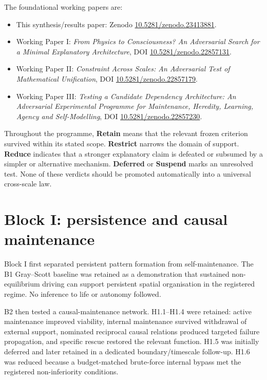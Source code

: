 \documentclass[11pt,a4paper]{article}
\begin{document}
The foundational working papers are:
\begin{itemize}[leftmargin=*]
\item This synthesis/results paper: Zenodo \href{https://doi.org/10.5281/zenodo.23413881}{10.5281/zenodo.23413881}.
\item Working Paper I: \emph{From Physics to Consciousness? An Adversarial Search for a Minimal Explanatory Architecture}, DOI \href{https://doi.org/10.5281/zenodo.22857131}{10.5281/zenodo.22857131}.
\item Working Paper II: \emph{Constraint Across Scales: An Adversarial Test of Mathematical Unification}, DOI \href{https://doi.org/10.5281/zenodo.22857179}{10.5281/zenodo.22857179}.
\item Working Paper III: \emph{Testing a Candidate Dependency Architecture: An Adversarial Experimental Programme for Maintenance, Heredity, Learning, Agency and Self-Modelling}, DOI \href{https://doi.org/10.5281/zenodo.22857230}{10.5281/zenodo.22857230}.
\end{itemize}

Throughout the programme, \textbf{Retain} means that the relevant frozen criterion survived within its stated scope. \textbf{Restrict} narrows the domain of support. \textbf{Reduce} indicates that a stronger explanatory claim is defeated or subsumed by a simpler or alternative mechanism. \textbf{Deferred} or \textbf{Suspend} marks an unresolved test. None of these verdicts should be promoted automatically into a universal cross-scale law.

\section{Block I: persistence and causal maintenance}

Block I first separated persistent pattern formation from self-maintenance. The B1 Gray--Scott baseline was retained as a demonstration that sustained non-equilibrium driving can support persistent spatial organisation in the registered regime. No inference to life or autonomy followed.

B2 then tested a causal-maintenance network. H1.1--H1.4 were retained: active maintenance improved viability, internal maintenance survived withdrawal of external support, nominated reciprocal causal relations produced targeted failure propagation, and specific rescue restored the relevant function. H1.5 was initially deferred and later retained in a dedicated boundary/timescale follow-up. H1.6 was reduced because a budget-matched brute-force internal bypass met the registered non-inferiority conditions.
\end{document}
